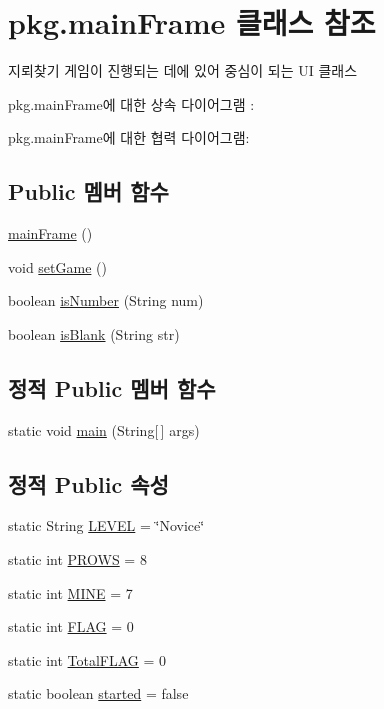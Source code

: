 \hypertarget{classpkg_1_1main_frame}{}\section{pkg.\+main\+Frame 클래스 참조}
\label{classpkg_1_1main_frame}


지뢰찾기 게임이 진행되는 데에 있어 중심이 되는 UI 클래스  




pkg.\+main\+Frame에 대한 상속 다이어그램 \+: 


pkg.\+main\+Frame에 대한 협력 다이어그램\+:
\subsection*{Public 멤버 함수}
\begin{DoxyCompactItemize}
\item 
\hyperlink{classpkg_1_1main_frame_a0edb10d75697656c940f3b5e3ba7d9ef}{main\+Frame} ()
\item 
void \hyperlink{classpkg_1_1main_frame_afee0fd4f159914a14f60d540051e99da}{set\+Game} ()
\item 
boolean \hyperlink{classpkg_1_1main_frame_a7de04de5a18ef73c659082c62f4fd250}{is\+Number} (String num)
\item 
boolean \hyperlink{classpkg_1_1main_frame_af58a9fa8a1605e5af98f91662963715b}{is\+Blank} (String str)
\end{DoxyCompactItemize}
\subsection*{정적 Public 멤버 함수}
\begin{DoxyCompactItemize}
\item 
static void \hyperlink{classpkg_1_1main_frame_a2d1242ddfef355cb870da28709a35479}{main} (String\mbox{[}$\,$\mbox{]} args)
\end{DoxyCompactItemize}
\subsection*{정적 Public 속성}
\begin{DoxyCompactItemize}
\item 
static String \hyperlink{classpkg_1_1main_frame_af08a1a3e5a422b15f9ebe173a386de24}{L\+E\+V\+EL} = \char`\"{}Novice\char`\"{}
\item 
static int \hyperlink{classpkg_1_1main_frame_a6d9a76db81895214a2acaab598dc2a7c}{P\+R\+O\+WS} = 8
\item 
static int \hyperlink{classpkg_1_1main_frame_a2d3b62dc427e3bfd3247b51456d78882}{M\+I\+NE} = 7
\item 
static int \hyperlink{classpkg_1_1main_frame_a505e81ce8df404341832e27fcb88e1de}{F\+L\+AG} = 0
\item 
static int \hyperlink{classpkg_1_1main_frame_a05dfc088773f5e52294e2ca37cccbcf1}{Total\+F\+L\+AG} = 0
\item 
static boolean \hyperlink{classpkg_1_1main_frame_ad050752ff60e9b7fa6ea201df1b223a6}{started} = false
\end{DoxyCompactItemize}
